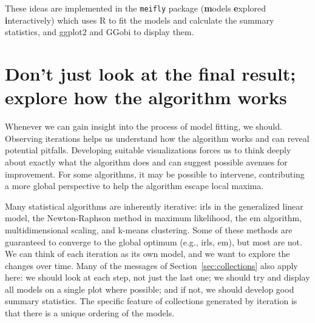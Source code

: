 \documentclass[preprint]{imsart}
\begin{document}

%

These ideas are implemented in the {\tt meifly} package ({\bf m}odels {\bf e}xplored {\bf i}nteractively) \citep{meifly} which uses R to fit the models and calculate the summary statistics, and ggplot2 and GGobi to display them.

\section{Don't just look at the final result; explore how the algorithm works}
\label{sec:iteration}

Whenever we can gain insight into the process of model fitting, we should. Observing iterations helps us understand how the algorithm works and can reveal potential pitfalls. Developing suitable visualizations forces us to think deeply about exactly what the algorithm does and can suggest possible avenues for improvement. For some algorithms, it may be possible to intervene, contributing a more global perspective to help the algorithm escape local maxima.

Many statistical algorithms are inherently iterative: {\sc irls} in the generalized linear model, the Newton-Raphson method in maximum likelihood, the {\sc em} algorithm, multidimensional scaling, and k-means clustering.  Some of these methods are guaranteed to converge to the global optimum (e.g., {\sc irls}, {\sc em}), but most are not.  We can think of each iteration as its own model, and we want to explore the changes over time.  Many of the messages of Section~\ref{sec:collections} also apply here: we should look at each step, not just the last one; we should try and display all models on a single plot where possible; and if not, we should develop good summary statistics.  The specific feature of collections generated by iteration is that there is a unique ordering of the models.
\end{document}
